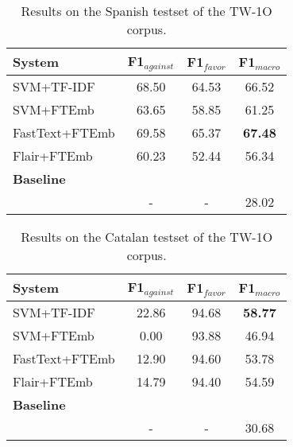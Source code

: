 \documentclass[10pt, a4paper]{article}
\begin{document}
\begin{table}[!ht]\small
\centering
\begin{tabular}{lccc} \hline
\textbf{System} & F1$_{against}$ & F1$_{favor}$ & F1$_{macro}$ \\ \hline
SVM+TF-IDF & 68.50 & 64.53 & 66.52 \\
SVM+FTEmb & 63.65 & 58.85 & 61.25 \\
FastText+FTEmb & 69.58 & 65.37 & \textbf{67.48} \\
Flair+FTEmb & 60.23 & 52.44 & 56.34 \\ \hline
\textbf{Baseline} \\
\cite{Segura-Bedmar18} & - & - & 28.02 \\ \hline
\end{tabular}
\caption{Results on the Spanish testset of the TW-1O corpus.}\label{tab:result_tw1o_es}
\end{table}

\begin{table}[!ht]\small
\centering
\begin{tabular}{lccc} \hline
\textbf{System} & F1$_{against}$ & F1$_{favor}$ & F1$_{macro}$\\ \hline
SVM+TF-IDF & 22.86 & 94.68 & \textbf{58.77} \\
SVM+FTEmb & 0.00 & 93.88 & 46.94 \\
FastText+FTEmb & 12.90 & 94.60 & 53.78 \\
Flair+FTEmb & 14.79 & 94.40 & 54.59 \\ \hline
\textbf{Baseline} \\
\scriptsize{\cite{Cuquerella2018CriCaTM}} & - & - & 30.68 \\  \hline
\end{tabular}
\caption{Results on the Catalan testset of the TW-1O corpus.}\label{tab:result_tw1o_ca}
\end{table}


\end{document}
